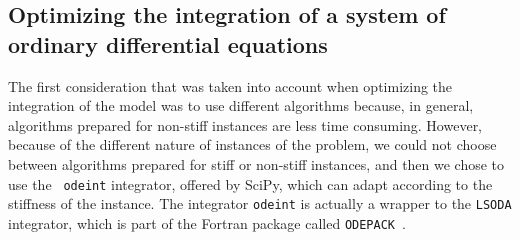 \subsection{Optimizing the integration of a system of ordinary
differential equations}
The first consideration that was taken into account when optimizing the
integration of the model was to use different algorithms because, in 
general, algorithms prepared for non-stiff instances are less time
consuming. However, because of the different nature of instances of 
the problem, we could not choose between algorithms prepared for stiff 
or non-stiff instances, and then we chose to use the {\tt
odeint} integrator, offered by SciPy, which can adapt according to the
stiffness of the instance. The integrator {\tt odeint} is actually a 
wrapper to the {\tt LSODA} integrator, which is part of the Fortran
package called {\tt ODEPACK}~\cite{Hindmarsh1982}.



